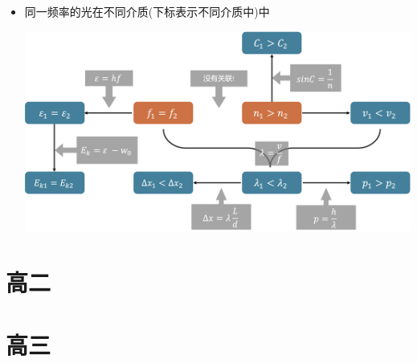 \documentclass{article}
\begin{document}
\begin{itemize}
\begin{formal}
\begin{itemize}
                    \vspace*{2em}

                    \item 同一频率的光在不同介质(下标表示不同介质中)中
                    
                    \vspace*{1em}
                    \includegraphics[width=40em,keepaspectratio]{./pictures/1.3-13.png}

                    
                \end{itemize}
            \end{formal}
        \end{itemize}
        

        

        
    


    \section{高二}





    \section{高三}
\end{document}
